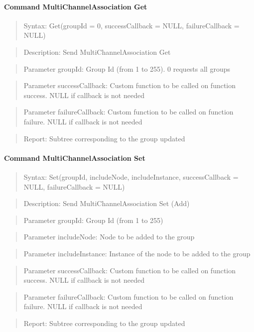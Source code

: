 \paragraph{Command MultiChannelAssociation Get}
\begin{quote}Syntax: Get(groupId = 0, successCallback = NULL, failureCallback = NULL)\end{quote}
\begin{quote}Description: Send MultiChannelAssociation Get\end{quote}
\begin{quote}Parameter groupId: Group Id (from 1 to 255). 0 requests all groups\end{quote}
\begin{quote}Parameter successCallback: Custom function to be called on function success. NULL if callback is not needed\end{quote}
\begin{quote}Parameter failureCallback: Custom function to be called on function failure. NULL if callback is not needed\end{quote}
\begin{quote}Report: Subtree corresponding to the group updated\end{quote}

\paragraph{Command MultiChannelAssociation Set}
\begin{quote}Syntax: Set(groupId, includeNode, includeInstance, successCallback = NULL, failureCallback = NULL)\end{quote}
\begin{quote}Description: Send MultiChannelAssociation Set (Add)\end{quote}
\begin{quote}Parameter groupId: Group Id (from 1 to 255)\end{quote}
\begin{quote}Parameter includeNode: Node to be added to the group\end{quote}
\begin{quote}Parameter includeInstance: Instance of the node to be added to the group\end{quote}
\begin{quote}Parameter successCallback: Custom function to be called on function success. NULL if callback is not needed\end{quote}
\begin{quote}Parameter failureCallback: Custom function to be called on function failure. NULL if callback is not needed\end{quote}
\begin{quote}Report: Subtree corresponding to the group updated\end{quote}

